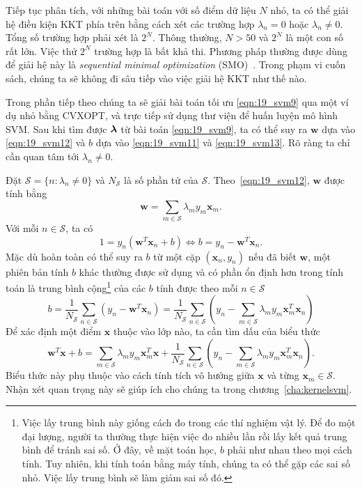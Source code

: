 Tiếp tục phân tích, với những bài toán với số điểm dữ liệu $N$ nhỏ, ta có thể
giải hệ điều kiện KKT phía trên bằng cách xét các trường hợp $\lambda_n = 0$
hoặc $\lambda_n \neq 0$. Tổng số trường hợp phải xét là $2^N$. Thông thường, $N
> 50$ và $2^N$ là một con số rất lớn. Việc thử $2^N$ trường hợp là bất khả thi.
Phương pháp thường được dùng để giải hệ này là \textit{sequential minimal
optimization} (SMO)~\cite{platt1998sequential,zeng2008fast}. Trong phạm vi cuốn
sách, chúng ta sẽ không đi sâu tiếp vào việc giải hệ KKT như thế nào.

Trong phần tiếp
theo chúng ta sẽ giải bài toán tối ưu \eqref{eqn:19_svm9} qua một ví dụ nhỏ bằng CVXOPT, và trực tiếp sử dụng thư viện  để huấn luyện mô hình SVM.
Sau khi tìm được $\boldsymbol{\lambda}$ từ bài toán \eqref{eqn:19_svm9}, ta có thể suy ra $\mathbf{w}$ dựa vào \eqref{eqn:19_svm12} và $b$ dựa vào
\eqref{eqn:19_svm11} và \eqref{eqn:19_svm13}. Rõ ràng ta chỉ cần quan tâm tới
$\lambda_n \neq 0$.

Đặt $\mathcal{S} = \{n: \lambda_n \neq 0\}$ và $N_{\mathcal{S}}$ là số
phần tử của $\mathcal{S}$. Theo~\eqref{eqn:19_svm12}, $\mathbf{w}$ được tính bằng
\begin{equation}
\label{eqn:19_}
\mathbf{w} = \sum_{m \in \mathcal{S}} \lambda_m y_m \mathbf{x}_m.
\end{equation}
Với mỗi $n \in \mathcal{S}$, ta có
\begin{equation*}
1 = y_n(\mathbf{w}^T\mathbf{x}_n + b) \Leftrightarrow b = y_n  - \mathbf{w}^T\mathbf{x}_n.
\end{equation*}
Mặc dù hoàn toàn có thể suy ra $b$ từ một cặp $(\mathbf{x}_n, y_n)$
nếu đã biết $\mathbf{w}$, một phiên bản tính $b$ khác thường được sử dụng và có phần {ổn định hơn trong tính toán}
là trung bình cộng\footnote{Việc lấy trung bình này giống cách đo trong các thí
nghiệm vật lý. Để đo một đại lượng, người ta thường thực hiện việc đo nhiều lần
rồi lấy kết quả trung bình để tránh sai số. Ở đây, về mặt toán học, $b$ phải như
nhau theo mọi cách tính. Tuy nhiên, khi tính toán bằng máy tính, chúng ta có thể
gặp các sai số nhỏ. Việc lấy trung bình sẽ làm giảm sai số đó.}  của các
$b$ tính được theo mỗi $n \in
\mathcal{S}$
\begin{equation}
\label{eqn:19_svm15}
b = \frac{1}{N_{\mathcal{S}}} \sum_{n \in \mathcal{S}}(y_n - \mathbf{w}^T\mathbf{x}_n) =
\frac{1}{N_{\mathcal{S}}} \sum_{n \in \mathcal{S}} \left(y_n - \sum_{m\in
\mathcal{S}} \lambda_m y_m \mathbf{x}_m^T \mathbf{x}_n\right)
\end{equation}
Để xác định một điểm $\mathbf{x}$ thuộc vào lớp nào, ta cần tìm dấu
của biểu thức
\begin{equation*}
\mathbf{w}^T\mathbf{x} + b = \sum_{m \in \mathcal{S}} \lambda_m y_m
\mathbf{x}_m^T \mathbf{x} + \frac{1}{N_{\mathcal{S}}} \sum_{n \in \mathcal{S}}
\left(y_n - \sum_{m\in \mathcal{S}} \lambda_m y_m \mathbf{x}_m^T \mathbf{x}_n\right).
\end{equation*}
Biểu thức này phụ thuộc vào cách tính tích vô hướng giữa $\mathbf{x}$ và từng
$\mathbf{x}_m \in \mathcal{S}$. Nhận xét quan trọng này sẽ giúp ích cho chúng ta
trong chương~\ref{cha:kernelsvm}.


